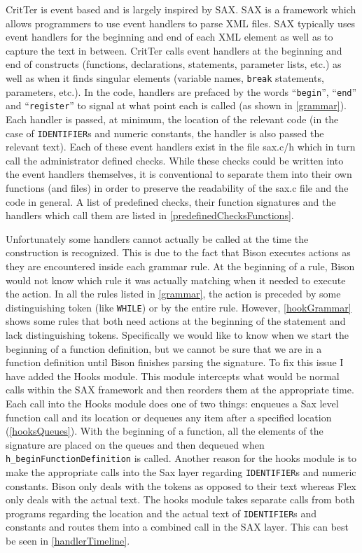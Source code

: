 \documentclass[12pt]{report}
\newcommand{\programName}{CritTer\xspace}
\begin{document}
\programName is event based and is largely inspired by SAX\cite{saxHomepage}. SAX is a 
framework which allows programmers to use event handlers to parse XML files. SAX typically uses
event handlers for the beginning and end of each XML element as well as to capture the text in 
between. \programName calls event handlers at the beginning and end of constructs (functions, 
declarations, statements, parameter lists, etc.) as well as when it finds singular elements (variable 
names, \lstinline{break} statements, parameters, etc.). In the code, handlers are prefaced by the words 
``\lstinline{begin}'', ``\lstinline{end}'' and ``\lstinline{register}'' to signal at what point each is called (as 
shown in \autoref{grammar}). Each handler is passed, at minimum, the location of the relevant code (in 
the case of \lstinline{IDENTIFIER}s and numeric constants, the handler is also passed the relevant 
text). Each of these event handlers exist in the file sax.c/h which in turn call the administrator defined 
checks. While these checks could be written into the event handlers themselves, it is conventional to 
separate them into their own functions (and files) in order to preserve the readability of the sax.c file 
and the code in general. A list of predefined checks, their function signatures and the handlers which 
call them are listed in \autoref{predefinedChecksFunctions}.

Unfortunately some handlers cannot actually be called at the time the construction is recognized. This 
is due to the fact that Bison executes actions as they are encountered inside each grammar rule. At the 
beginning of a rule, Bison would not know which rule it was actually matching when it needed to 
execute the action. In all the rules listed in \autoref{grammar}, the action is preceded by some 
distinguishing token (like \lstinline{WHILE}) or by the entire rule. However, \autoref{hookGrammar} 
shows some rules that both need actions at the beginning of the statement and lack distinguishing 
tokens. Specifically we would like to know when we start the beginning of a function definition, but we 
cannot be sure that we are in a function definition until Bison finishes parsing the signature. To fix this 
issue I have added the Hooks module. This module intercepts what would be normal calls within the 
SAX framework and then reorders them at the appropriate time. Each call into the Hooks module does 
one of two things: enqueues a Sax level function call and its location or dequeues any item after a 
specified location (\autoref{hooksQueues}). With the beginning of a function, all the elements of the 
signature are placed on the queues and then dequeued when \lstinline{h_beginFunctionDefinition} is 
called. Another reason for the hooks module is to make the appropriate calls into the Sax layer 
regarding \lstinline{IDENTIFIER}s and numeric constants. Bison only deals with the tokens as opposed 
to their text whereas Flex only deals with the actual text. The hooks module takes separate calls from 
both programs regarding the location and the actual text of \lstinline{IDENTIFIER}s and constants and 
routes them into a combined call in the SAX layer. This can best be seen in \autoref{handlerTimeline}.
\end{document}
